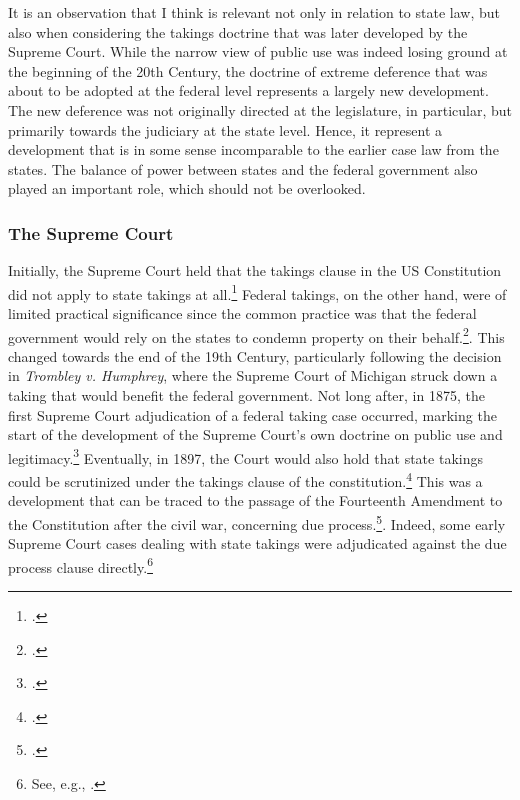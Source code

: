 It is an observation that I think is relevant not only in relation to state law, but also when considering the takings doctrine that was later developed by the Supreme Court. While the narrow view of public use was indeed losing ground at the beginning of the 20th Century, the doctrine of extreme deference that was about to be adopted at the federal level represents a largely new development. The new deference was not originally directed at the legislature, in particular, but primarily towards the judiciary at the state level. Hence, it represent a development that is in some sense incomparable to the earlier case law from the states. The balance of power between states and the federal government also played an important role, which should not be overlooked.

\subsubsection{The Supreme Court}\label{subsec:US}

Initially, the Supreme Court held that the takings clause in the US Constitution did not apply to state takings at all.\footcite{barron33} Federal takings, on the other hand, were of limited practical significance since the common practice was that the federal government would rely on the states to condemn property on their behalf.\footcite[30]{meidinger80}. This changed towards the end of the 19th Century, particularly following the decision in {\it Trombley v. Humphrey}, where the Supreme Court of Michigan struck down a taking that would benefit the federal government.\cite{trombley71} Not long after, in 1875, the first Supreme Court adjudication of a federal taking case occurred, marking the start of the development of the Supreme Court's own doctrine on public use and legitimacy.\footcite{kohl75} Eventually, in 1897, the Court would also hold that state takings could be scrutinized under the takings clause of the constitution.\footcite{chicago97} This was a development that can be traced to the passage of the Fourteenth Amendment to the Constitution after the civil war, concerning due process.\footcite{johnson11}. Indeed, some early Supreme Court cases dealing with state takings were adjudicated against the due process clause directly.\footnote{See, e.g., \cite{head85}.}

